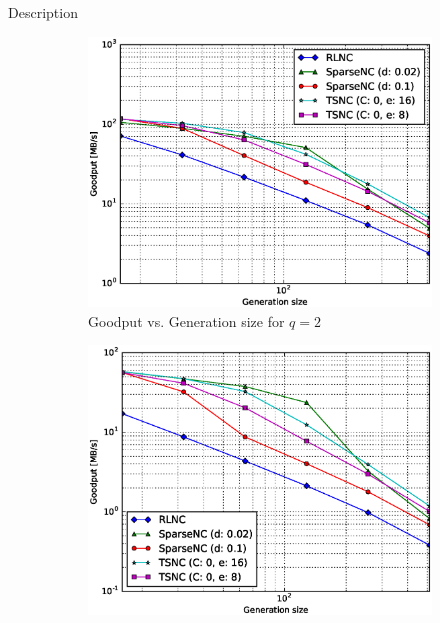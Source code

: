 Description

\begin{figure}
    \centering
    \begin{subfigure}[b]{0.475\textwidth}
        \centering
        \includegraphics[width=1.15\textwidth]{images/06_06_2016/goodput_vs_generation_size_Rasp_v2_decoder_Binary_1600.eps}
        \caption[]%
        {{\small Goodput vs. Generation size for $q = 2$}}
        \label{fig:dec_good_rasp2_gen_gf2}
    \end{subfigure}
    \hfill
    \begin{subfigure}[b]{0.475\textwidth}
        \centering
        \includegraphics[width=1.15\textwidth]{images/06_06_2016/goodput_vs_generation_size_Rasp_v2_decoder_Binary8_1600.eps}

\end{subfigure}
\end{figure}

